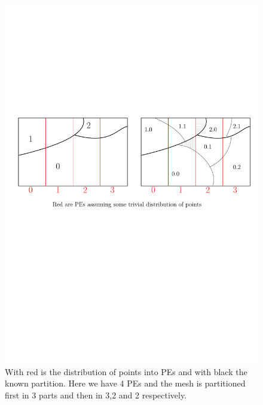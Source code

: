 \documentclass[a4paper,10pt]{article}
\begin{document}
\begin{figure}
\includegraphics[scale=0.7]{heterog_tree_part_with_PEs}
\caption{With red is the distribution of points into PEs and with black the known partition.
Here we have 4 PEs and the mesh is partitioned first in 3 parts and then in 3,2 and 2 respectively.}
\label{fig:heterog_withPEs}
\end{figure}
\end{document}
